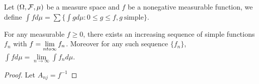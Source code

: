 \begin{definition}
Let $(\Omega, \mathcal F, \mu)$ be a measure space and $f$ be a nonegative measurable function, we define $\int f d\mu=\sum\{\int gd\mu: 0\leq g\leq f, g\ \text{simple} \}$.
\end{definition}

\begin{theorem}
For any measurable $f\geq 0$, there exists an increasing sequence of simple functions $f_n$ with $f=\lim\limits_{n\\to \infty}f_n$. Moreover for any such sequence $\{f_n \}$, $\int fd\mu=\lim\limits_{n\to \infty}\int f_nd\mu$.
\end{theorem}

\begin{proof}
Let $A_{nj}=f^{-1}$
\end{proof}